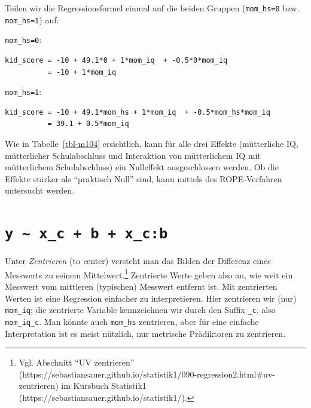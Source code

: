 \documentclass[
  ngerman,
  letterpaper,
  twoside,
  open=any]{scrbook}
\theoremstyle{definition}
\theoremstyle{plain}
\theoremstyle{definition}
\theoremstyle{definition}
\theoremstyle{definition}
\theoremstyle{definition}
\theoremstyle{remark}
\begin{document}
Teilen wir die Regressionsformel einmal auf die beiden Gruppen
(\texttt{mom\_hs=0} bzw. \texttt{mom\_hs=1}) auf:

\texttt{mom\_hs=0}:

\begin{verbatim}
kid_score = -10 + 49.1*0 + 1*mom_iq  + -0.5*0*mom_iq
          = -10 + 1*mom_iq
\end{verbatim}

\texttt{mom\_hs=1}:

\begin{verbatim}
kid_score = -10 + 49.1*mom_hs + 1*mom_iq  + -0.5*mom_hs*mom_iq
          = 39.1 + 0.5*mom_iq
\end{verbatim}

Wie in Tabelle~\ref{tbl-m104} ersichtlich, kann für alle drei Effekte
(mütterliche IQ, mütterlicher Schulabschluss und Interaktion von
mütterlichem IQ mit mütterlichem Schulabschluss) ein Nulleffekt
ausgeschlossen werden. Ob die Effekte stärker als \enquote{praktisch
Null} sind, kann mittels des ROPE-Verfahren untersucht werden.

\section{\texorpdfstring{\texttt{y\ \textasciitilde{}\ x\_c\ +\ b\ +\ x\_c:b}}{y \textasciitilde{} x\_c + b + x\_c:b}}\label{y-x_c-b-x_cb}

Unter \emph{Zentrieren} (to \emph{c}enter) versteht man das Bilden der
Differenz eines Messwerts zu seinem Mittelwert.\footnote{Vgl. Abschnitt
  \enquote{UV zentrieren}
  (https://sebastiansauer.github.io/statistik1/090-regression2.html\#uv-zentrieren)
  im Kursbuch Statistik1 (https://sebastiansauer.github.io/statistik1/).}
Zentrierte Werte geben also an, wie weit ein Messwert vom mittleren
(typischen) Messwert entfernt ist. Mit zentrierten Werten ist eine
Regression einfacher zu interpretieren. Hier zentrieren wir (nur)
\texttt{mom\_iq}; die zentrierte Variable kennzeichnen wir durch den
Suffix \texttt{\_c}, also \texttt{mom\_iq\_c}. Man könnte auch
\texttt{mom\_hs} zentrieren, aber für eine einfache Interpretation ist
es meist nützlich, nur metrische Prädiktoren zu zentrieren.
\end{document}
